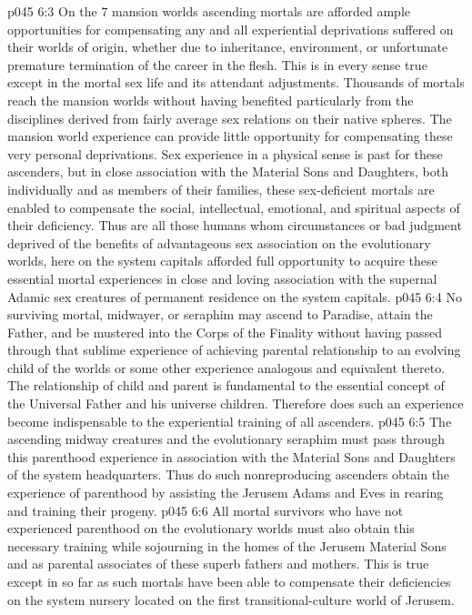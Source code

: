 \vs p045 6:3 On the 7 mansion worlds ascending mortals are afforded ample opportunities for compensating any and all experiential deprivations suffered on their worlds of origin, whether due to inheritance, environment, or unfortunate premature termination of the career in the flesh. This is in every sense true except in the mortal sex life and its attendant adjustments. Thousands of mortals reach the mansion worlds without having benefited particularly from the disciplines derived from fairly average sex relations on their native spheres. The mansion world experience can provide little opportunity for compensating these very personal deprivations. Sex experience in a physical sense is past for these ascenders, but in close association with the Material Sons and Daughters, both individually and as members of their families, these sex\hyp{}deficient mortals are enabled to compensate the social, intellectual, emotional, and spiritual aspects of their deficiency. Thus are all those humans whom circumstances or bad judgment deprived of the benefits of advantageous sex association on the evolutionary worlds, here on the system capitals afforded full opportunity to acquire these essential mortal experiences in close and loving association with the supernal Adamic sex creatures of permanent residence on the system capitals.
\vs p045 6:4 \pc No surviving mortal, midwayer, or seraphim may ascend to Paradise, attain the Father, and be mustered into the Corps of the Finality without having passed through that sublime experience of achieving parental relationship to an evolving child of the worlds or some other experience analogous and equivalent thereto. The relationship of child and parent is fundamental to the essential concept of the Universal Father and his universe children. Therefore does such an experience become indispensable to the experiential training of all ascenders.
\vs p045 6:5 The ascending midway creatures and the evolutionary seraphim must pass through this parenthood experience in association with the Material Sons and Daughters of the system headquarters. Thus do such nonreproducing ascenders obtain the experience of parenthood by assisting the Jerusem Adams and Eves in rearing and training their progeny.
\vs p045 6:6 All mortal survivors who have not experienced parenthood on the evolutionary worlds must also obtain this necessary training while sojourning in the homes of the Jerusem Material Sons and as parental associates of these superb fathers and mothers. This is true except in so far as such mortals have been able to compensate their deficiencies on the system nursery located on the first transitional\hyp{}culture world of Jerusem.
